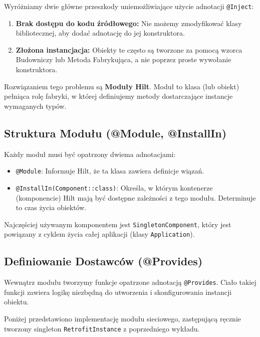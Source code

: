 Wyróżniamy dwie główne przeszkody uniemożliwiające użycie adnotacji \texttt{@Inject}:
\begin{enumerate}
    \item \textbf{Brak dostępu do kodu źródłowego:} Nie możemy zmodyfikować klasy bibliotecznej, aby dodać adnotację do jej konstruktora.
    \item \textbf{Złożona instancjacja:} Obiekty te często są tworzone za pomocą wzorca Budowniczy lub Metoda Fabrykująca, a nie poprzez proste wywołanie konstruktora.
\end{enumerate}

Rozwiązaniem tego problemu są \textbf{Moduły Hilt}. Moduł to klasa (lub obiekt) pełniąca rolę fabryki, w której definiujemy metody dostarczające instancje wymaganych typów.

\subsection{Struktura Modułu (@Module, @InstallIn)}

Każdy moduł musi być opatrzony dwiema adnotacjami:
\begin{itemize}
    \item \texttt{@Module}: Informuje Hilt, że ta klasa zawiera definicje wiązań.
    \item \texttt{@InstallIn(Component::class)}: Określa, w którym kontenerze (komponencie) Hilt mają być dostępne zależności z tego modułu. Determinuje to czas życia obiektów.
\end{itemize}

Najczęściej używanym komponentem jest \texttt{SingletonComponent}, który jest powiązany z cyklem życia całej aplikacji (klasy \texttt{Application}).

\subsection{Definiowanie Dostawców (@Provides)}

Wewnątrz modułu tworzymy funkcje opatrzone adnotacją \texttt{@Provides}. Ciało takiej funkcji zawiera logikę niezbędną do utworzenia i skonfigurowania instancji obiektu.

Poniżej przedstawiono implementację modułu sieciowego, zastępującą ręcznie tworzony singleton \texttt{RetrofitInstance} z poprzedniego wykładu.

